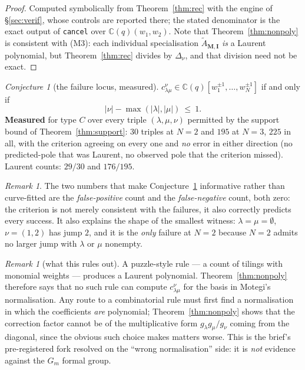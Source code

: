 \documentclass[11pt]{article}
\theoremstyle{plain}
\theoremstyle{definition}
\theoremstyle{remark}
\newtheorem{rem}[thm]{Remark}
\newtheorem{conj}[thm]{Conjecture}
\newcommand{\bI}{\mathbf{I}}
\newcommand{\bM}{\mathbf{M}}
\begin{document}
\begin{proof}
Computed symbolically from Theorem~\ref{thm:rec} with the engine of
\S\ref{sec:verif}, whose controls are reported there; the stated denominator is
the exact output of \texttt{cancel} over $\mathbb C(q)(w_1,w_2)$.  Note that
Theorem~\ref{thm:nonpoly} is consistent with (M3): each individual
specialisation $\widetilde A_{\bM,\bI}$ \emph{is} a Laurent polynomial, but
Theorem~\ref{thm:rec} divides by $\Delta_{\nu}$, and that division need not be
exact.
\end{proof}

\begin{conj}[the failure locus, measured]\label{conj:locus}
$c^{\nu}_{\lambda\mu}\in\mathbb C(q)[w_1^{\pm1},\dots,w_N^{\pm1}]$ if and only if
\[
|\nu|-\max(|\lambda|,|\mu|)\ \le\ 1 .
\]
\textbf{Measured} for type $C$ over every triple $(\lambda,\mu,\nu)$ permitted by
the support bound of Theorem~\ref{thm:support}: $30$ triples at $N=2$ and $195$
at $N=3$, $225$ in all, with the criterion agreeing on every one and \emph{no}
error in either direction (no predicted-pole that was Laurent, no observed pole
that the criterion missed).  Laurent counts: $29/30$ and $176/195$.
\end{conj}

\begin{rem}
The two numbers that make Conjecture~\ref{conj:locus} informative rather than
curve-fitted are the \emph{false-positive} count and the \emph{false-negative}
count, both zero: the criterion is not merely consistent with the failures, it
also correctly predicts every success.  It also explains the shape of the
smallest witness: $\lambda=\mu=\emptyset$, $\nu=(1,2)$ has jump $2$, and it is
the \emph{only} failure at $N=2$ because $N=2$ admits no larger jump with
$\lambda$ or $\mu$ nonempty.
\end{rem}

\begin{rem}[what this rules out]
A puzzle-style rule --- a count of tilings with monomial weights --- produces a
Laurent polynomial.  Theorem~\ref{thm:nonpoly} therefore says that no such rule
can compute $c^{\nu}_{\lambda\mu}$ for the basis in Motegi's normalisation.  Any
route to a combinatorial rule must first find a normalisation in which the
coefficients \emph{are} polynomial; Theorem~\ref{thm:nonpoly} shows that the
correction factor cannot be of the multiplicative form
$g_{\lambda}g_{\mu}/g_{\nu}$ coming from the diagonal, since the obvious such
choice makes matters worse.  This is the brief's pre-registered fork resolved on
the ``wrong normalisation'' side: it is \emph{not} evidence against the $G_m$
formal group.
\end{rem}
\end{document}
